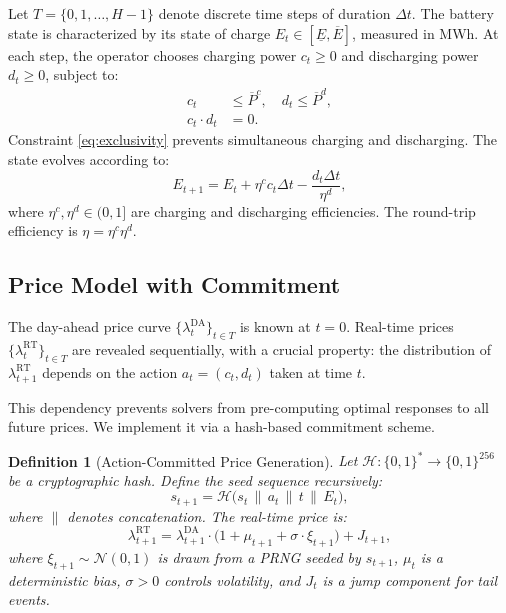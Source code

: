 \documentclass[11pt]{article}
\newtheorem{definition}{Definition}
\begin{document}
Let $T = \{0, 1, \ldots, H-1\}$ denote discrete time steps of duration $\Delta t$. The battery state is characterized by its state of charge $E_t \in [\underline{E}, \overline{E}]$, measured in MWh. At each step, the operator chooses charging power $c_t \geq 0$ and discharging power $d_t \geq 0$, subject to:
\begin{align}
    c_t &\leq \overline{P}^c, \quad d_t \leq \overline{P}^d, \label{eq:power_bounds}\\
    c_t \cdot d_t &= 0. \label{eq:exclusivity}
\end{align}
Constraint \eqref{eq:exclusivity} prevents simultaneous charging and discharging. The state evolves according to:
\begin{equation}\label{eq:dynamics}
    E_{t+1} = E_t + \eta^c c_t \Delta t - \frac{d_t \Delta t}{\eta^d},
\end{equation}
where $\eta^c, \eta^d \in (0,1]$ are charging and discharging efficiencies. The round-trip efficiency is $\eta = \eta^c \eta^d$.

\subsection{Price Model with Commitment}

The day-ahead price curve $\{\lambda^{\text{DA}}_t\}_{t \in T}$ is known at $t=0$. Real-time prices $\{\lambda^{\text{RT}}_t\}_{t \in T}$ are revealed sequentially, with a crucial property: the distribution of $\lambda^{\text{RT}}_{t+1}$ depends on the action $a_t = (c_t, d_t)$ taken at time $t$.

This dependency prevents solvers from pre-computing optimal responses to all future prices. We implement it via a hash-based commitment scheme.

\begin{definition}[Action-Committed Price Generation]
Let $\mathcal{H}: \{0,1\}^* \to \{0,1\}^{256}$ be a cryptographic hash. Define the seed sequence recursively:
\begin{equation}\label{eq:seed}
    s_{t+1} = \mathcal{H}\bigl(s_t \,\|\, a_t \,\|\, t \,\|\, E_t\bigr),
\end{equation}
where $\|$ denotes concatenation. The real-time price is:
\begin{equation}\label{eq:rt_price}
    \lambda^{\text{RT}}_{t+1} = \lambda^{\text{DA}}_{t+1} \cdot \bigl(1 + \mu_{t+1} + \sigma \cdot \xi_{t+1}\bigr) + J_{t+1},
\end{equation}
where $\xi_{t+1} \sim \mathcal{N}(0,1)$ is drawn from a PRNG seeded by $s_{t+1}$, $\mu_t$ is a deterministic bias, $\sigma > 0$ controls volatility, and $J_t$ is a jump component for tail events.
\end{definition}
\end{document}
